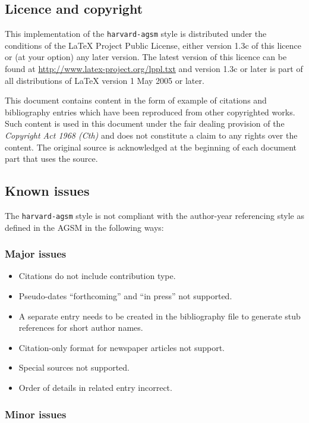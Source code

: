 \documentclass[a4paper,landscape,12pt]{article}
\begin{document}
\subsection{Licence and copyright}

This implementation of the \texttt{harvard-agsm} style is distributed under the conditions of the LaTeX Project Public License, either version 1.3c of this licence or (at your option) any later version.  The latest version of this licence can be found at \url{http://www.latex-project.org/lppl.txt} and version 1.3c or later is part of all distributions of LaTeX version 1 May 2005 or later.

This document contains content in the form of example of citations and bibliography entries which have been reproduced from other copyrighted works.  Such content is used in this document under the fair dealing provision of the \textit{Copyright Act 1968 (Cth)} and does not constitute a claim to any rights over the content.  The original source is acknowledged at the beginning of each document part that uses the source.

\subsection{Known issues}

The \texttt{harvard-agsm} style is not compliant with the author-year referencing style as defined in the AGSM in the following ways:

\subsubsection{Major issues}

\begin{itemize}
	\item Citations do not include contribution type.
	\item Pseudo-dates ``forthcoming'' and ``in press'' not supported.
	\item A separate entry needs to be created in the bibliography file to generate stub references for short author names.
	\item Citation-only format for newspaper articles not support.
	\item Special sources not supported.
	\item Order of details in related entry incorrect.
\end{itemize}

\subsubsection{Minor issues}
\end{document}
